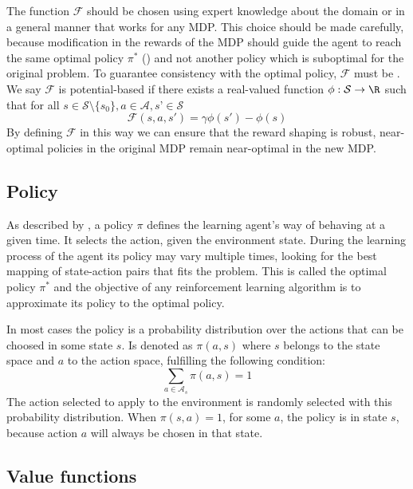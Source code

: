 The function $\mathcal{F}$ should be chosen using expert knowledge about the domain or in a general manner that works for any MDP. This choice should be made carefully, because modification in the rewards of the MDP should guide the agent to reach the same optimal policy $\pi^*$ () and not another policy which is suboptimal for the original problem. To guarantee consistency with the optimal policy, $\mathcal{F}$ must be . We say $\mathcal{F}$ is potential-based if there exists a real-valued function
$\phi : \mathcal{S} \rightarrow \R$ such that for all $s \in \mathcal{S} \setminus \{s_0\} , a \in \mathcal{A}, s’ \in \mathcal{S}$
\begin{equation}
    \mathcal{F}(s, a, s') = \gamma \phi(s') - \phi(s)
\end{equation}
By defining $\mathcal{F}$ in this way we can ensure that the reward shaping is robust, near-optimal policies in the original \ac{MDP} remain near-optimal in the new \ac{MDP}.

\subsection{Policy\label{subsec:policy}}

As described by \citeauthor*[Section~1.3]{sutton1998introduction}, a policy $\pi$ defines the learning agent’s way of behaving at a given time. It selects the action, given the environment state. During the learning process of the agent its policy may vary multiple times, looking for the best mapping of state-action pairs that fits the problem. This is called the optimal policy $\pi^*$ and the objective of any reinforcement learning algorithm is to approximate its policy to the optimal policy.

In most cases the policy is a probability distribution over the actions that can be choosed in some state $s$. Is denoted as $\pi(a,s)$ where $s$ belongs to the state space and $a$ to the action space, fulfilling the following condition:
\begin{equation}
    \sum_{a \in \mathcal{A}_s} \pi(a,s) = 1
\end{equation}
The action selected to apply to the environment is randomly selected with this probability distribution. When $\pi(s,a)=1$, for some $a$, the policy is  in state $s$, because action $a$ will always be chosen in that state.

\subsection{Value functions}

